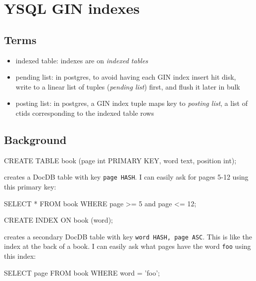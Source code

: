 \documentclass[11pt]{article}
\providecommand{\tightlist}{%
  \setlength{\itemsep}{0pt}\setlength{\parskip}{0pt}}
\begin{document}
\hypertarget{ysql-gin-indexes}{%
\section{YSQL GIN indexes}\label{ysql-gin-indexes}}

\hypertarget{terms}{%
\subsection{Terms}\label{terms}}

\begin{itemize}
\tightlist
\item
  indexed table: indexes are on \emph{indexed tables}
\item
  pending list: in postgres, to avoid having each GIN index insert hit
  disk, write to a linear list of tuples (\emph{pending list}) first,
  and flush it later in bulk
\item
  posting list: in postgres, a GIN index tuple maps key to \emph{posting
  list}, a list of ctids corresponding to the indexed table rows
\end{itemize}

\hypertarget{background}{%
\subsection{Background}\label{background}}

\begin{sqlcode}
CREATE TABLE book (page int PRIMARY KEY, word text, position int);
\end{sqlcode}

creates a DocDB table with key \texttt{page\ HASH}. I can easily ask for
pages 5-12 using this primary key:

\begin{sqlcode}
SELECT * FROM book WHERE page >= 5 and page <= 12;
\end{sqlcode}

\begin{sqlcode}
CREATE INDEX ON book (word);
\end{sqlcode}

creates a secondary DocDB table with key
\texttt{word\ HASH,\ page\ ASC}. This is like the index at the back of a
book. I can easily ask what pages have the word \texttt{foo} using this
index:

\begin{sqlcode}
SELECT page FROM book WHERE word = 'foo';
\end{sqlcode}
\end{document}
